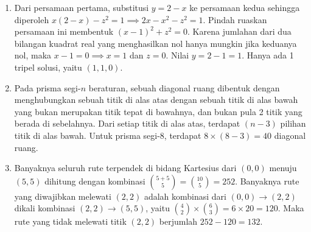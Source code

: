 \documentclass{article}
\begin{document}
\begin{enumerate}
\item Dari persamaan pertama, substitusi $y = 2 - x$ ke persamaan kedua sehingga diperoleh $x(2-x) - z^2 = 1 \implies 2x - x^2 - z^2 = 1$. Pindah ruaskan persamaan ini membentuk $(x-1)^2 + z^2 = 0$. Karena jumlahan dari dua bilangan kuadrat real yang menghasilkan nol hanya mungkin jika keduanya nol, maka $x-1 = 0 \implies x=1$ dan $z=0$. Nilai $y = 2-1 = 1$. Hanya ada 1 tripel solusi, yaitu $(1, 1, 0)$.

\item Pada prisma segi-$n$ beraturan, sebuah diagonal ruang dibentuk dengan menghubungkan sebuah titik di alas atas dengan sebuah titik di alas bawah yang bukan merupakan titik tepat di bawahnya, dan bukan pula 2 titik yang berada di sebelahnya. Dari setiap titik di alas atas, terdapat $(n - 3)$ pilihan titik di alas bawah. Untuk prisma segi-8, terdapat $8 \times (8-3) = 40$ diagonal ruang.

\item Banyaknya seluruh rute terpendek di bidang Kartesius dari $(0,0)$ menuju $(5,5)$ dihitung dengan kombinasi $\binom{5+5}{5} = \binom{10}{5} = 252$. Banyaknya rute yang diwajibkan melewati $(2,2)$ adalah kombinasi dari $(0,0) \to (2,2)$ dikali kombinasi $(2,2) \to (5,5)$, yaitu $\binom{4}{2} \times \binom{6}{3} = 6 \times 20 = 120$. Maka rute yang tidak melewati titik $(2,2)$ berjumlah $252 - 120 = 132$.

\end{enumerate}
\end{document}
